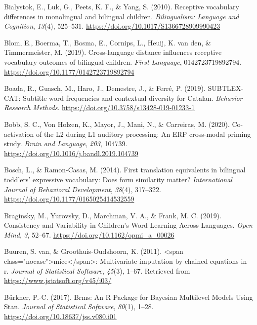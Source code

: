 \documentclass[english,man,man,floatsintext]{apa6}
\begin{document}
\leavevmode\hypertarget{ref-bialystok2010}{}%
Bialystok, E., Luk, G., Peets, K. F., \& Yang, S. (2010). Receptive vocabulary differences in monolingual and bilingual children. \emph{Bilingualism: Language and Cognition}, \emph{13}(4), 525--531. \url{https://doi.org/10.1017/S1366728909990423}

\leavevmode\hypertarget{ref-blom2019}{}%
Blom, E., Boerma, T., Bosma, E., Cornips, L., Heuij, K. van den, \& Timmermeister, M. (2019). Cross-language distance influences receptive vocabulary outcomes of bilingual children. \emph{First Language}, 0142723719892794. \url{https://doi.org/10.1177/0142723719892794}

\leavevmode\hypertarget{ref-boada2019}{}%
Boada, R., Guasch, M., Haro, J., Demestre, J., \& Ferré, P. (2019). SUBTLEX-CAT: Subtitle word frequencies and contextual diversity for Catalan. \emph{Behavior Research Methods}. \url{https://doi.org/10.3758/s13428-019-01233-1}

\leavevmode\hypertarget{ref-bobb2020}{}%
Bobb, S. C., Von Holzen, K., Mayor, J., Mani, N., \& Carreiras, M. (2020). Co-activation of the L2 during L1 auditory processing: An ERP cross-modal priming study. \emph{Brain and Language}, \emph{203}, 104739. \url{https://doi.org/10.1016/j.bandl.2019.104739}

\leavevmode\hypertarget{ref-bosch2014}{}%
Bosch, L., \& Ramon-Casas, M. (2014). First translation equivalents in bilingual toddlers' expressive vocabulary: Does form similarity matter? \emph{International Journal of Behavioral Development}, \emph{38}(4), 317--322. \url{https://doi.org/10.1177/0165025414532559}

\leavevmode\hypertarget{ref-braginsky2019}{}%
Braginsky, M., Yurovsky, D., Marchman, V. A., \& Frank, M. C. (2019). Consistency and Variability in Children's Word Learning Across Languages. \emph{Open Mind}, \emph{3}, 52--67. \url{https://doi.org/10.1162/opmi_a_00026}

\leavevmode\hypertarget{ref-vanbuuren2011}{}%
Buuren, S. van, \& Groothuis-Oudshoorn, K. (2011). \textless{}span class="nocase"\textgreater{}mice\textless{}/span\textgreater{}: Multivariate imputation by chained equations in r. \emph{Journal of Statistical Software}, \emph{45}(3), 1--67. Retrieved from \url{https://www.jstatsoft.org/v45/i03/}

\leavevmode\hypertarget{ref-burkner2017}{}%
Bürkner, P.-C. (2017). Brms: An R Package for Bayesian Multilevel Models Using Stan. \emph{Journal of Statistical Software}, \emph{80}(1), 1--28. \url{https://doi.org/10.18637/jss.v080.i01}
\end{document}
